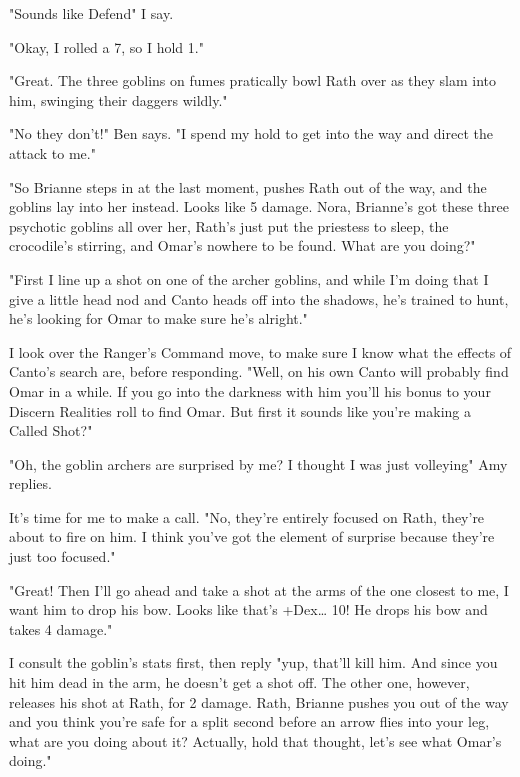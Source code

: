  

"Sounds like Defend" I say.

 

"Okay, I rolled a 7, so I hold 1."

 

"Great. The three goblins on fumes pratically bowl Rath over as they slam into him, swinging their daggers wildly."

 

"No they don't!" Ben says. "I spend my hold to get into the way and direct the attack to me."

 

"So Brianne steps in at the last moment, pushes Rath out of the way, and the goblins lay into her instead. Looks like 5 damage. Nora, Brianne's got these three psychotic goblins all over her, Rath's just put the priestess to sleep, the crocodile's stirring, and Omar's nowhere to be found. What are you doing?"

 

"First I line up a shot on one of the archer goblins, and while I'm doing that I give a little head nod and Canto heads off into the shadows, he's trained to hunt, he's looking for Omar to make sure he's alright."

 

I look over the Ranger's Command move, to make sure I know what the effects of Canto's search are, before responding. "Well, on his own Canto will probably find Omar in a while. If you go into the darkness with him you'll his bonus to your Discern Realities roll to find Omar. But first it sounds like you're making a Called Shot?"

 

"Oh, the goblin archers are surprised by me? I thought I was just volleying" Amy replies.

 

It's time for me to make a call. "No, they're entirely focused on Rath, they're about to fire on him. I think you've got the element of surprise because they're just too focused."

 

"Great! Then I'll go ahead and take a shot at the arms of the one closest to me, I want him to drop his bow. Looks like that's +Dex… 10! He drops his bow and takes 4 damage."

 

I consult the goblin's stats first, then reply "yup, that'll kill him. And since you hit him dead in the arm, he doesn't get a shot off. The other one, however, releases his shot at Rath, for 2 damage. Rath, Brianne pushes you out of the way and you think you're safe for a split second before an arrow flies into your leg, what are you doing about it? Actually, hold that thought, let's see what Omar's doing."


